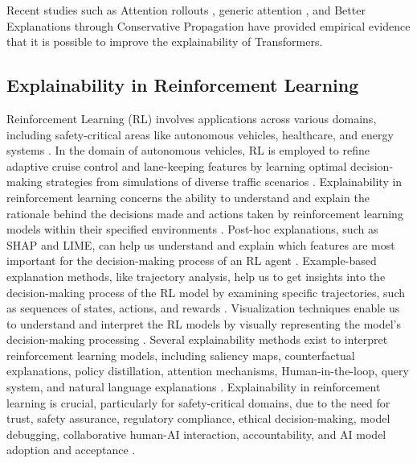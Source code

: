 \documentclass[final,5p,times,twocolumn]{elsarticle}
\begin{document}
Recent studies such as  Attention rollouts \cite{abnar2020quantifying}, generic attention \cite{chefer2021generic}, and Better Explanations through Conservative Propagation \cite{ali2022xai} have provided empirical evidence that it is possible to improve the explainability of Transformers.


\subsection{Explainability in Reinforcement Learning}

Reinforcement Learning (RL) involves applications across various domains, including safety-critical areas like autonomous vehicles, healthcare, and energy systems \cite{rana2023safety, yu2021reinforcement}. In the domain of autonomous vehicles, RL is employed to refine adaptive cruise control and lane-keeping features by learning optimal decision-making strategies from simulations of diverse traffic scenarios \cite{ye2019automated}. Explainability in reinforcement learning concerns the ability to understand and explain the rationale behind the decisions made and actions taken by reinforcement learning models within their specified environments \cite{vouros2022explainable, madumal2020explainable, puiutta2020explainable}. Post-hoc explanations, such as SHAP and LIME, can help us understand and explain which features are most important for the decision-making process of an RL agent \cite{heuillet2022collective, heuillet2021explainability}. Example-based explanation methods, like trajectory analysis, help us to get insights into the decision-making process of the RL model by examining specific trajectories, such as sequences of states, actions, and rewards \cite{zhang2023learning}. Visualization techniques enable us to understand and interpret the RL models by visually representing the model’s decision-making processing \cite{wells2021explainable}. Several explainability methods exist to interpret reinforcement learning models, including saliency maps, counterfactual explanations, policy distillation, attention mechanisms, 	Human-in-the-loop, query system, and natural language explanations \cite{alharin2020reinforcement}. Explainability in reinforcement learning is crucial, particularly for safety-critical domains, due to the need for trust, safety assurance, regulatory compliance, ethical decision-making, model debugging, collaborative human-AI interaction, accountability, and AI model adoption and acceptance \cite{vouros2022explainable,chamola2023review, lai2021towards}.
\end{document}
